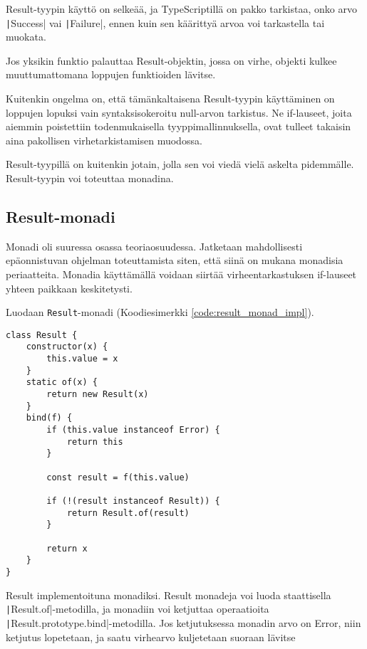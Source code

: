 Result-tyypin käyttö on selkeää, ja TypeScriptillä on pakko tarkistaa, onko arvo \texttt|Success| vai \texttt|Failure|, ennen kuin sen käärittyä arvoa voi tarkastella tai muokata.

Jos yksikin funktio palauttaa Result-objektin, jossa on virhe, objekti kulkee muuttumattomana loppujen funktioiden lävitse.

Kuitenkin ongelma on, että tämänkaltaisena Result-tyypin käyttäminen on loppujen lopuksi vain syntaksisokeroitu null-arvon tarkistus. Ne if-lauseet, joita aiemmin poistettiin todenmukaisella tyyppimallinnuksella, ovat tulleet takaisin aina pakollisen virhetarkistamisen muodossa.

Result-tyypillä on kuitenkin jotain, jolla sen voi viedä vielä askelta pidemmälle. Result-tyypin voi toteuttaa monadina.


\subsection{Result-monadi}

Monadi oli suuressa osassa teoriaosuudessa. Jatketaan mahdollisesti epäonnistuvan ohjelman toteuttamista siten, että siinä on mukana monadisia periaatteita. Monadia käyttämällä voidaan siirtää virheentarkastuksen if-lauseet yhteen paikkaan keskitetysti.

Luodaan \texttt{Result}-monadi (Koodiesimerkki \ref{code:result_monad_impl}).


\begin{code}
    \begin{verbatim}
class Result {
    constructor(x) {
        this.value = x
    }
    static of(x) {
        return new Result(x)
    }
    bind(f) {
        if (this.value instanceof Error) {
            return this
        }

        const result = f(this.value)

        if (!(result instanceof Result)) {
            return Result.of(result)
        }

        return x
    }
}
\end{verbatim}
    \caption{Result implementoituna monadiksi. Result monadeja voi luoda staattisella \texttt|Result.of|-metodilla, ja monadiin voi ketjuttaa operaatioita \texttt|Result.prototype.bind|-metodilla. Jos ketjutuksessa monadin arvo on Error, niin ketjutus lopetetaan, ja saatu virhearvo kuljetetaan suoraan lävitse}
    \label{code:result_monad_impl}
\end{code}

